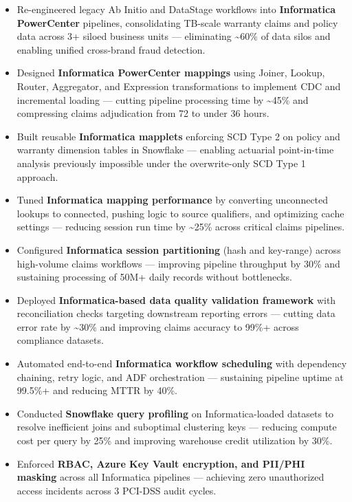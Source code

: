 \documentclass[a4paper,10pt]{article}
\begin{document}
\begin{itemize}
    \item Re-engineered legacy Ab Initio and DataStage workflows into \textbf{Informatica PowerCenter} pipelines, consolidating TB-scale warranty claims and policy data across 3+ siloed business units — eliminating \textasciitilde 60\% of data silos and enabling unified cross-brand fraud detection.
    \item Designed \textbf{Informatica PowerCenter mappings} using Joiner, Lookup, Router, Aggregator, and Expression transformations to implement CDC and incremental loading — cutting pipeline processing time by \textasciitilde 45\% and compressing claims adjudication from 72 to under 36 hours.
    \item Built reusable \textbf{Informatica mapplets} enforcing SCD Type 2 on policy and warranty dimension tables in Snowflake — enabling actuarial point-in-time analysis previously impossible under the overwrite-only SCD Type 1 approach.
    \item Tuned \textbf{Informatica mapping performance} by converting unconnected lookups to connected, pushing logic to source qualifiers, and optimizing cache settings — reducing session run time by \textasciitilde 25\% across critical claims pipelines.
    \item Configured \textbf{Informatica session partitioning} (hash and key-range) across high-volume claims workflows — improving pipeline throughput by 30\% and sustaining processing of 50M+ daily records without bottlenecks.
    \item Deployed \textbf{Informatica-based data quality validation framework} with reconciliation checks targeting downstream reporting errors — cutting data error rate by \textasciitilde 30\% and improving claims accuracy to 99\%+ across compliance datasets.
    \item Automated end-to-end \textbf{Informatica workflow scheduling} with dependency chaining, retry logic, and ADF orchestration — sustaining pipeline uptime at 99.5\%+ and reducing MTTR by 40\%.
    \item Conducted \textbf{Snowflake query profiling} on Informatica-loaded datasets to resolve inefficient joins and suboptimal clustering keys — reducing compute cost per query by 25\% and improving warehouse credit utilization by 30\%.
    \item Enforced \textbf{RBAC, Azure Key Vault encryption, and PII/PHI masking} across all Informatica pipelines — achieving zero unauthorized access incidents across 3 PCI-DSS audit cycles.

\end{itemize}
\end{document}
